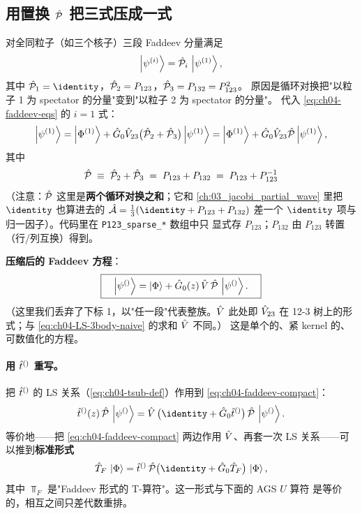 \subsection{用置换 \(\hat{\mathcal{P}}\) 把三式压成一式}
\label{subsec:ch04-1plusP}

对全同粒子（如三个核子）三段 Faddeev 分量满足
\begin{equation}
\label{eq:ch04-Pop-on-psi}
\ket{\psi^{(i)}} = \hat{\mathcal{P}}_i\,\ket{\psi^{(1)}},
\end{equation}
其中 \(\Pop_1 = \identity\)，\(\hat{\mathcal{P}}_2 = P_{123}\)，\(\hat{\mathcal{P}}_3 = P_{132} = P_{123}^2\)。
原因是循环对换把"以粒子 1 为 spectator 的分量"变到"以粒子 2 为 spectator 的分量"。
代入 \cref{eq:ch04-faddeev-eqs} 的 \(i = 1\) 式：
\begin{equation}
\ket{\psi^{(1)}}
= \ket{\Phi^{(1)}} + \hat{G}_0 \hat{V}_{23} \big( \hat{\mathcal{P}}_2 + \hat{\mathcal{P}}_3 \big) \ket{\psi^{(1)}}
= \ket{\Phi^{(1)}} + \hat{G}_0 \hat{V}_{23} \hat{\mathcal{P}} \ket{\psi^{(1)}},
\end{equation}
其中
\begin{equation}
\label{eq:ch04-P-sum-def}
\hat{\mathcal{P}} \;\equiv\; \hat{\mathcal{P}}_2 + \hat{\mathcal{P}}_3 \;=\; P_{123} + P_{132} \;=\; P_{123} + P_{123}^{-1}
\end{equation}
（注意：\(\hat{\mathcal{P}}\) 这里是\textbf{两个循环对换之和}；它和 \cref{ch:03_jacobi_partial_wave}
里把 \(\identity\) 也算进去的 \(\Aop = \tfrac{1}{3}(\identity + P_{123} + P_{132})\) 差一个
\(\identity\) 项与归一因子）。代码里在 \texttt{P123\_sparse\_*} 数组中只
显式存 \(P_{123}\)；\(P_{132}\) 由 \(P_{123}\) 转置（行/列互换）得到。

\textbf{压缩后的 Faddeev 方程}：
\begin{equation}
\label{eq:ch04-faddeev-compact}
\boxed{
\quad
\ket{\psi^{()}}
= \ket{\Phi}
+ \hat{G}_0(z)\,\hat{V}\,\hat{\mathcal{P}}\,\ket{\psi^{()}}.
\quad
}
\end{equation}
（这里我们丢弃了下标 1，以"任一段"代表整族。\(\hat{V}\) 此处即 \(\hat{V}_{23}\)
在 12-3 树上的形式；与 \cref{eq:ch04-LS-3body-naive} 的求和 \(\hat{V}\) 不同。）
这是单个的、紧 kernel 的、可数值化的方程。

\paragraph{用 \(\hat{t}^{()}\) 重写。}
把 \(\hat{t}^{()}\) 的 LS 关系（\cref{eq:ch04-tsub-def}）作用到 \cref{eq:ch04-faddeev-compact}：
\begin{equation}
\label{eq:ch04-faddeev-T-form}
\Tsub{}(\zeplus)\,\Pop\,\ket{\psifad{}}
= \Vop\,\big(\identity + \Gzero \Tsub{}\big)\,\Pop\,\ket{\psifad{}}.
\end{equation}
等价地——把 \cref{eq:ch04-faddeev-compact} 两边作用 \(\hat{V}\)、再套一次
LS 关系——可以推到\textbf{标准形式} \cite{Glockle1983}
\begin{equation}
\label{eq:ch04-T-from-faddeev}
\Top_{F}\,\ket{\Phi} = \Tsub{}\,\Pop \big( \identity + \Gzero \Top_F \big)\,\ket{\Phi},
\end{equation}
其中 \(\Top_F\) 是"Faddeev 形式的 T-算符"。这一形式与下面的 AGS \(U\) 算符
是等价的，相互之间只差代数重排。

